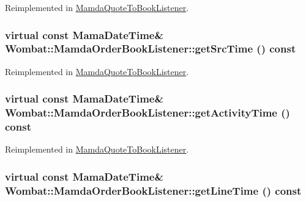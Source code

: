 Reimplemented in \hyperlink{classMamdaQuoteToBookListener_67a3d0c1e838d687724c0d20f15849cc}{Mamda\-Quote\-To\-Book\-Listener}.\hypertarget{classWombat_1_1MamdaOrderBookListener_44f0107552d26551644736520b00b530}{
\subsubsection[getSrcTime]{\setlength{\rightskip}{0pt plus 5cm}virtual const Mama\-Date\-Time\& Wombat::Mamda\-Order\-Book\-Listener::get\-Src\-Time () const}}
\label{classWombat_1_1MamdaOrderBookListener_44f0107552d26551644736520b00b530}




Reimplemented in \hyperlink{classMamdaQuoteToBookListener_1c5157c6e1d241d1d78133731b44d01a}{Mamda\-Quote\-To\-Book\-Listener}.\hypertarget{classWombat_1_1MamdaOrderBookListener_d696de0b8a7d04c239f813163c9f63b9}{
\subsubsection[getActivityTime]{\setlength{\rightskip}{0pt plus 5cm}virtual const Mama\-Date\-Time\& Wombat::Mamda\-Order\-Book\-Listener::get\-Activity\-Time () const}}
\label{classWombat_1_1MamdaOrderBookListener_d696de0b8a7d04c239f813163c9f63b9}




Reimplemented in \hyperlink{classMamdaQuoteToBookListener_d8627c07f82c0c7c88401cc096e16cd8}{Mamda\-Quote\-To\-Book\-Listener}.\hypertarget{classWombat_1_1MamdaOrderBookListener_5c765d829c1eca59880839fe360b4497}{
\subsubsection[getLineTime]{\setlength{\rightskip}{0pt plus 5cm}virtual const Mama\-Date\-Time\& Wombat::Mamda\-Order\-Book\-Listener::get\-Line\-Time () const}}
\label{classWombat_1_1MamdaOrderBookListener_5c765d829c1eca59880839fe360b4497}




